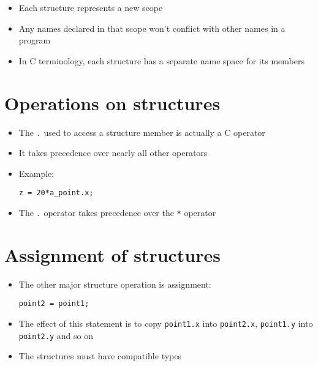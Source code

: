 \documentclass{article}
\begin{document}
\begin{itemize}
\item Each structure represents a new scope

\item Any names declared in that scope won't conflict with other names in a program

\item In C terminology, each structure has a separate name space for its members
\end{itemize}



\section{Operations on structures}
\begin{itemize}
\item The \verb!.! used to access a structure member is actually a C operator
\item It takes precedence over nearly all other operators
\item Example:

\begin{verbatim}
z = 20*a_point.x;
\end{verbatim}

\item The \verb!.! operator takes precedence over the \verb!*! operator
\end{itemize}



\section{Assignment of structures}
\begin{itemize}
\item The other major structure operation is assignment:
\begin{verbatim}
point2 = point1;
\end{verbatim}

\item The effect of this statement is to copy \verb!point1.x! into \verb!point2.x!, \verb!point1.y! into \verb!point2.y! and so on

\item The structures must have compatible types

\end{itemize}
\end{document}
